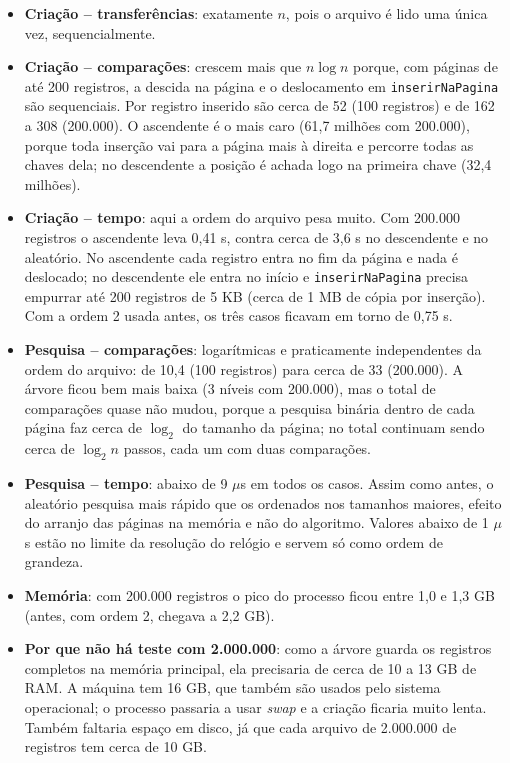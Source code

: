 \documentclass{article}
\begin{document}
\begin{itemize}
    \item \textbf{Criação -- transferências}: exatamente $n$, pois o arquivo é lido uma única vez, sequencialmente.
    \item \textbf{Criação -- comparações}: crescem mais que $n \log n$ porque, com páginas de até 200 registros, a descida na página e o deslocamento em \texttt{inserirNaPagina} são sequenciais. Por registro inserido são cerca de 52 (100 registros) e de 162 a 308 (200.000). O ascendente é o mais caro (61,7 milhões com 200.000), porque toda inserção vai para a página mais à direita e percorre todas as chaves dela; no descendente a posição é achada logo na primeira chave (32,4 milhões).
    \item \textbf{Criação -- tempo}: aqui a ordem do arquivo pesa muito. Com 200.000 registros o ascendente leva 0,41 s, contra cerca de 3,6 s no descendente e no aleatório. No ascendente cada registro entra no fim da página e nada é deslocado; no descendente ele entra no início e \texttt{inserirNaPagina} precisa empurrar até 200 registros de 5 KB (cerca de 1 MB de cópia por inserção). Com a ordem 2 usada antes, os três casos ficavam em torno de 0,75 s.
    \item \textbf{Pesquisa -- comparações}: logarítmicas e praticamente independentes da ordem do arquivo: de 10,4 (100 registros) para cerca de 33 (200.000). A árvore ficou bem mais baixa (3 níveis com 200.000), mas o total de comparações quase não mudou, porque a pesquisa binária dentro de cada página faz cerca de $\log_2$ do tamanho da página; no total continuam sendo cerca de $\log_2 n$ passos, cada um com duas comparações.
    \item \textbf{Pesquisa -- tempo}: abaixo de 9 $\mu$s em todos os casos. Assim como antes, o aleatório pesquisa mais rápido que os ordenados nos tamanhos maiores, efeito do arranjo das páginas na memória e não do algoritmo. Valores abaixo de 1 $\mu$s estão no limite da resolução do relógio e servem só como ordem de grandeza.
    \item \textbf{Memória}: com 200.000 registros o pico do processo ficou entre 1,0 e 1,3 GB (antes, com ordem 2, chegava a 2,2 GB).
    \item \textbf{Por que não há teste com 2.000.000}: como a árvore guarda os registros completos na memória principal, ela precisaria de cerca de 10 a 13 GB de RAM. A máquina tem 16 GB, que também são usados pelo sistema operacional; o processo passaria a usar \emph{swap} e a criação ficaria muito lenta. Também faltaria espaço em disco, já que cada arquivo de 2.000.000 de registros tem cerca de 10 GB.
\end{itemize}
\end{document}
